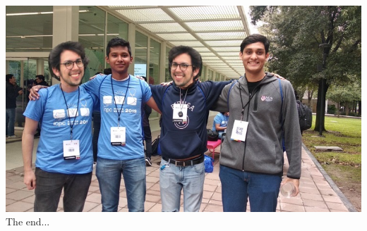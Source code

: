 \documentclass{article}
\begin{document}
  

  

  \centering
  \includegraphics[width=17cm]{fullTeam.JPG} \\
  {\Huge The end...\\}
\end{document}
